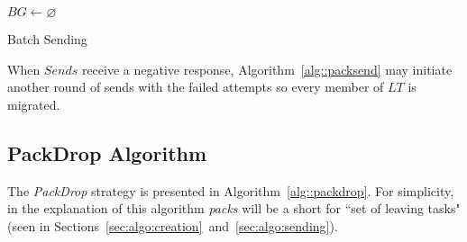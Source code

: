 \begin{algorithm}[!hb]
    \DontPrintSemicolon
    $BG \gets \varnothing$ \\
    \caption{Batch Sending}  
    \label{alg::packsend}
\end{algorithm}

When $Sends$ receive a negative response, Algorithm~\ref{alg::packsend} may initiate another round of sends with the failed attempts so every member of $LT$ is migrated.

\subsection{PackDrop Algorithm} \label{sec:algo:main}

The \textit{PackDrop} strategy is presented in Algorithm~\ref{alg::packdrop}.
For simplicity, in the explanation of this algorithm \textit{packs} will be a short for ``set of leaving tasks" (seen in Sections~\ref{sec:algo:creation}~and~\ref{sec:algo:sending}).

